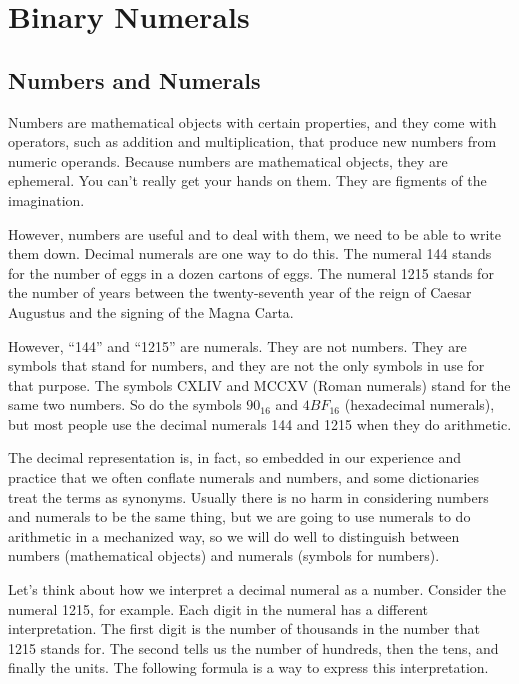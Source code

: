 \chapter{Binary Numerals}
\label{ch:binary-numerals}
\section{Numbers and Numerals}
\label{sec:numbers-numerals}
Numbers are mathematical objects with certain properties,
and they come with operators, such as addition
and multiplication, that produce new numbers from numeric
operands.
Because numbers are mathematical objects, they are ephemeral.
You can't really get your hands on them.
They are figments of the imagination.

However, numbers are useful and to deal with them,
we need to be able to write them down.
Decimal numerals are one way to do this.
The numeral 144 stands for the number
of eggs in a dozen cartons of eggs.
The numeral 1215 stands for the number of
years between the twenty-seventh year of the reign
of Caesar Augustus and the signing of the Magna Carta.

However, ``144'' and ``1215'' are numerals.
They are not numbers. They are symbols that stand for numbers,
and they are not the only symbols in use for that purpose.
The symbols CXLIV and MCCXV (Roman numerals) stand for the same two numbers.
So do the symbols $90_{16}$ and $4BF_{16}$ (hexadecimal numerals),
but most people use the decimal numerals 144 and 1215 when they do arithmetic.

The decimal representation is, in fact, so embedded in
our experience and practice that we often conflate
numerals and numbers, and some dictionaries treat the terms as synonyms.
Usually there is no harm in considering numbers and numerals 
to be the same thing, but we are going to use numerals
to do arithmetic in a mechanized way, so we will
do well to distinguish between 
numbers (mathematical objects)
and numerals (symbols for numbers).

Let's think about how we interpret a decimal numeral as a number.
Consider the numeral 1215, for example.
Each digit in the numeral has a different interpretation.
The first digit is the number of thousands in the number
that 1215 stands for. The second tells us the number
of hundreds, then the tens, and finally the units.
The following formula is a way to express this interpretation.


